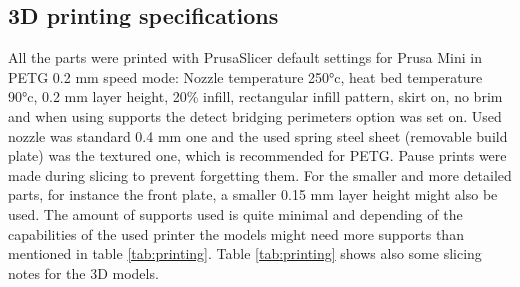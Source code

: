 \documentclass[a4paper,11pt]{article}
\begin{document}
\subsection{3D printing specifications}
\label{sec:printing}

All the parts were printed with PrusaSlicer default settings for Prusa Mini in PETG 0.2 mm speed mode: Nozzle temperature 250°c, heat bed temperature 90°c, 0.2 mm layer height, 20\% infill, rectangular infill pattern, skirt on, no brim and when using supports the detect bridging perimeters option was set on. Used nozzle was standard 0.4 mm one and the used spring steel sheet (removable build plate) was the textured one, which is recommended for PETG. Pause prints were made during slicing to prevent forgetting them. For the smaller and more detailed parts, for instance the front plate, a smaller 0.15 mm layer height might also be used. The amount of supports used is quite minimal and depending of the capabilities of the used printer the models might need more supports than mentioned in table \ref{tab:printing}. Table \ref{tab:printing} shows also some slicing notes for the 3D models.
\end{document}
